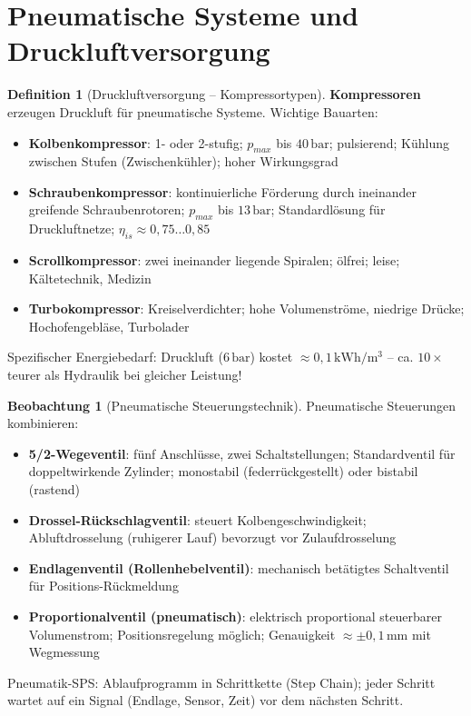 ﻿\documentclass[a4paper,12pt]{report}
\theoremstyle{definition}
\newtheorem{definition}{Definition}
\newtheorem{beobachtung}{Beobachtung}
\begin{document}
\section{Pneumatische Systeme und Druckluftversorgung}

\begin{definition}[Druckluftversorgung -- Kompressortypen]
\textbf{Kompressoren} erzeugen Druckluft für pneumatische Systeme.
Wichtige Bauarten:
\begin{itemize}
    \item[-] \textbf{Kolbenkompressor}: 1- oder 2-stufig; $p_{max}$ bis $40\,\mathrm{bar}$;
          pulsierend; Kühlung zwischen Stufen (Zwischenkühler); hoher Wirkungsgrad
    \item[-] \textbf{Schraubenkompressor}: kontinuierliche Förderung durch
          ineinander greifende Schraubenrotoren; $p_{max}$ bis $13\,\mathrm{bar}$;
          Standardlösung für Druckluftnetze; $\eta_{is} \approx 0{,}75\ldots0{,}85$
    \item[-] \textbf{Scrollkompressor}: zwei ineinander liegende Spiralen;
          ölfrei; leise; Kältetechnik, Medizin
    \item[-] \textbf{Turbokompressor}: Kreiselverdichter; hohe Volumenströme,
          niedrige Drücke; Hochofengebläse, Turbolader
\end{itemize}
Spezifischer Energiebedarf: Druckluft ($6\,\mathrm{bar}$) kostet
$\approx 0{,}1\,\mathrm{kWh/m^3}$ -- ca. $10\times$ teurer als Hydraulik
bei gleicher Leistung!
\end{definition}

\begin{beobachtung}[Pneumatische Steuerungstechnik]
Pneumatische Steuerungen kombinieren:
\begin{itemize}
    \item[-] \textbf{5/2-Wegeventil}: fünf Anschlüsse, zwei Schaltstellungen;
          Standardventil für doppeltwirkende Zylinder; monostabil (federrückgestellt)
          oder bistabil (rastend)
    \item[-] \textbf{Drossel-Rückschlagventil}: steuert Kolbengeschwindigkeit;
          Abluftdrosselung (ruhigerer Lauf) bevorzugt vor Zulaufdrosselung
    \item[-] \textbf{Endlagenventil (Rollenhebelventil)}: mechanisch betätigtes
          Schaltventil für Positions-Rückmeldung
    \item[-] \textbf{Proportionalventil (pneumatisch)}: elektrisch proportional
          steuerbarer Volumenstrom; Positionsregelung möglich;
          Genauigkeit $\approx \pm 0{,}1\,\mathrm{mm}$ mit Wegmessung
\end{itemize}
Pneumatik-SPS: Ablaufprogramm in Schrittkette (Step Chain); jeder Schritt
wartet auf ein Signal (Endlage, Sensor, Zeit) vor dem nächsten Schritt.
\end{beobachtung}
\end{document}
